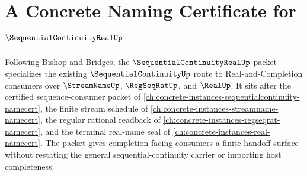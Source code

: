 \chapter{A Concrete Naming Certificate for $\SequentialContinuityRealUp$}
\label{ch:concrete-instances-sequential-continuity-real-namecert}

Following Bishop and Bridges, the $\SequentialContinuityRealUp$ packet specializes the existing $\SequentialContinuityUp$ route to Real-and-Completion consumers over $\StreamNameUp$, $\RegSeqRatUp$, and $\RealUp$. It sits after the certified sequence-consumer packet of \autoref{ch:concrete-instances-sequentialcontinuity-namecert}, the finite stream schedule of \autoref{ch:concrete-instances-streamname-namecert}, the regular rational readback of \autoref{ch:concrete-instances-regseqrat-namecert}, and the terminal real-name seal of \autoref{ch:concrete-instances-real-namecert}. The packet gives completion-facing consumers a finite handoff surface without restating the general sequential-continuity carrier or importing host completeness.


